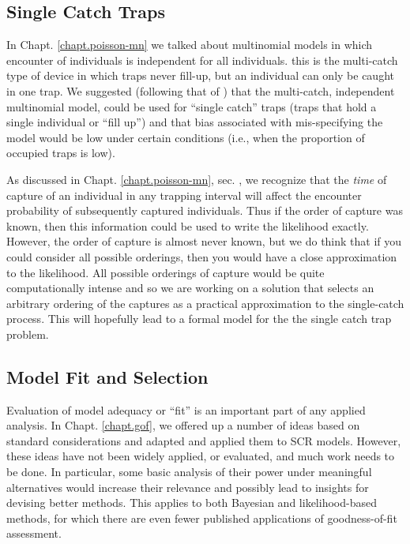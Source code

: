 \subsection{Single Catch Traps}

In Chapt. \ref{chapt.poisson-mn} we talked about multinomial models in
which encounter of individuals is independent for all
individuals. this is the multi-catch type of device in which traps
never fill-up, but an individual can only be caught in one trap. We
suggested (following that of \citet{efford_etal:2009euring}) that the
multi-catch, independent multinomial model, could be used for ``single
catch'' traps (traps that hold a single individual or ``fill up'') and
that bias associated with mis-specifying the model would be low under
certain conditions (i.e., when the proportion of occupied traps is
low).

As discussed in Chapt. \ref{chapt.poisson-mn}, 
sec. \label{poisson-mn.sec.singlecatch},
we recognize that the {\it time} of capture of an
individual in any trapping interval will affect the encounter
probability of subsequently captured individuals. Thus if 
the order of capture was known, then this information could be 
used to write the likelihood exactly. However, the order of capture
is almost never known, but we do think that if you could consider all
possible orderings, then you would have a close approximation to the
likelihood. All possible orderings of capture would be quite
computationally intense and so we are working on a solution that selects
an arbitrary ordering of the captures as a practical approximation to the
single-catch process. This will hopefully lead to a formal model
for the the single catch trap problem.


\subsection{Model Fit and Selection}

Evaluation of model adequacy or ``fit'' is an important part of any
applied analysis. In Chapt. \ref{chapt.gof}, we offered up a number of
ideas based on standard considerations and adapted and applied them
to SCR models. However, these ideas have not been widely applied, or
evaluated, and much work needs to be done. In particular, some basic
analysis of their power under meaningful alternatives would increase
their relevance and possibly lead to insights for devising better
methods. This applies to both Bayesian and likelihood-based methods,
for which there are even fewer published applications of
goodness-of-fit assessment.

